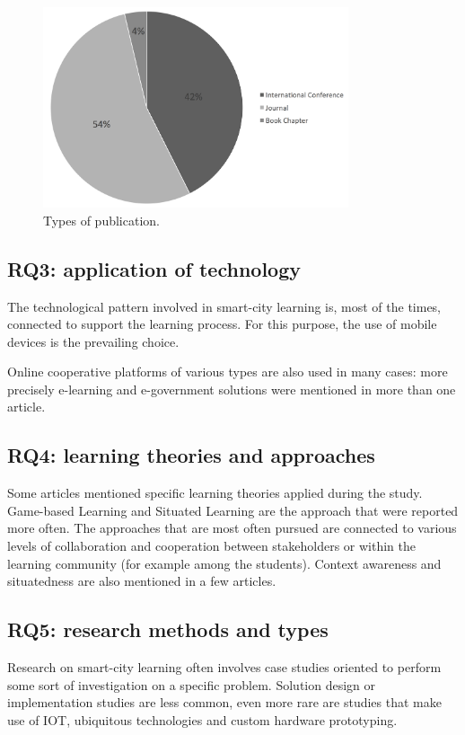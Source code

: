 \begin{figure}[tbh]
\centering
\includegraphics[width=9cm]{img/publication}
\caption{Types of publication.}
\label{fig:publications}
\end{figure}


\subsection*{RQ3: application of technology}

The technological pattern involved in smart-city learning is, most of the times, connected to support the learning process.
For this purpose, the use of mobile devices is the prevailing choice.

Online cooperative platforms of various types are also used in many cases: more precisely e-learning and e-government solutions were mentioned in more than one article.


\subsection*{RQ4: learning theories and approaches}

Some articles mentioned specific learning theories applied during the study. Game-based Learning and Situated Learning\cite{anderson_situated_1996} are the approach that were reported more often.
The approaches that are most often pursued are connected to various levels of collaboration and cooperation between stakeholders or within the learning community (for example among the students). Context awareness and situatedness are also mentioned in a few articles.

\subsection*{RQ5: research methods and types}
Research on smart-city learning often involves case studies oriented to perform some sort of investigation on a specific problem. Solution design or implementation studies are less common, even more rare are studies that make use of IOT, ubiquitous technologies and custom hardware prototyping.